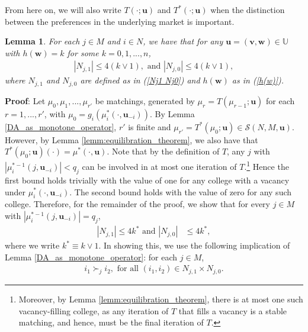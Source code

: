 \documentclass[12pt, fullpage]{amsart}
\newtheorem{lemma}{Lemma}[section]
\theoremstyle{definition}
\theoremstyle{definition}
\theoremstyle{definition}
\begin{document}
\begin{bibunit}[econometrica]
From here on, we will also write $T(\cdot;\boldsymbol{u})$ and $T^*(\cdot;\boldsymbol{u})$
when the distinction between the preferences in the underlying market is important.

\begin{lemma}
	\label{lem:change_at_college}  For each $j\in M$ and $i\in N$, we have that for any $\boldsymbol{u} = (\boldsymbol{v},\boldsymbol{w}) \in\mathbb{U}$ with $h(\boldsymbol{w}) =k$ for some $k = 0,1,...,n$,
	\begin{align*}
		\left|N_{j,1}\right| \leq 4(k\vee 1),\text{ and } \left|N_{j,0}\right| \leq  4(k\vee 1),
	\end{align*}
	where $N_{j,1}$ and $N_{j,0}$ are defined as in (\ref{Nj1 Nj0}) and $h(\boldsymbol{w})$ as in (\ref{h(w)}).
\end{lemma}

\noindent \textbf{Proof}: Let $\mu_{0},\mu_{1},...,\mu_{r'}$ be matchings, generated  by $\mu_{r}=T(\mu_{r-1}; \boldsymbol{u})$ for each $r=1,...,r'$, with $\mu_{0}=g_{i}(\mu_{i}^*(\cdot,\boldsymbol{u}_{-i}))$. By Lemma \ref{DA_as_monotone_operator}, $r'$
is finite and $\mu_{r'}=T^{*}(\mu_{0}; \boldsymbol{u})\in\mathcal{S}(N,M,\boldsymbol{u})$.
However, by Lemma \ref{lemm:equilibration_theorem}, we also have
that $T^{*}(\mu_{0}; \boldsymbol{u})(\cdot)=\mu^*(\cdot,\boldsymbol{u})$.
Note that by the definition of $T$, any $j$ with $|\mu_{i}^{*-1}(j,\boldsymbol{u}_{-i})|<q_{j}$
can be involved in at most one iteration of $T$.\footnote{Moreover, by Lemma \ref{lemm:equilibration_theorem}, there is at most one such vacancy-filling college, as any iteration of $T$ that fills a vacancy is a stable matching, and hence, must be the final iteration of $T$.}  Hence the first
bound holds trivially with the value of one for any college with a
vacancy under $\mu_{i}^*(\cdot,\boldsymbol{u}_{-i})$. The second bound
holds with the value of zero for any such college. Therefore, for
the remainder of the proof, we show that for every $j\in M$ with $|\mu_{i}^{*-1}(j,\boldsymbol{u}_{-i})|=q_{j}$,
\begin{align}\label{eq:displaced_and_new}
	\left|N_{j,1}\right|\leq 4k^{*} \text{ and }\left|N_{j,0}\right| & \leq 4k^{*},
\end{align}
where we write $k^{*}\equiv k\vee 1$. In showing this, we use the following implication of Lemma \ref{DA_as_monotone_operator}: for each $j\in M$,
\begin{align}
	i_{1}\succ_{j}i_{2},\text{ for all }(i_{1},i_{2})\in N_{j,1}\times N_{j,0}.\label{eq:displaced_student_is_worse_than_any_new_student-1}
\end{align}


\end{bibunit}
\end{document}
